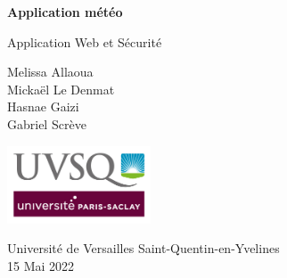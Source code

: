 \begin{titlepage}
    \begin{center}
        \vspace*{1cm}

        \Huge
        \textbf{Application météo}

        \vspace{0.4cm}
        \LARGE
        Application Web et Sécurité

        \vspace{1.6cm}

        \large
        Melissa Allaoua \\
        Mickaël Le Denmat \\
        Hasnae Gaizi \\
        Gabriel Scrève \\

        \vspace{10cm}

        \includegraphics[width=0.32\textwidth]{images/UVSQ-logo}

        \vspace{0.4cm}

        \Large
        Université de Versailles Saint-Quentin-en-Yvelines \\
        \vspace{0.4cm}
        15 Mai 2022
    \end{center}
\end{titlepage}